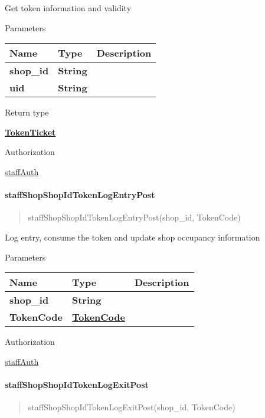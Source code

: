 Get token information and validity

Parameters

\begin{longtable}[]{@{}lll@{}}
\toprule
Name & Type & Description\tabularnewline
\midrule
\endhead
\textbf{shop\_id} & \textbf{String} &\tabularnewline
\textbf{uid} & \textbf{String} &\tabularnewline
\bottomrule
\end{longtable}

Return type

\href{../Models/TokenTicket.md}{\textbf{TokenTicket}}

Authorization

\href{../README.md\#staffAuth}{staffAuth}

\hypertarget{staffshopshopidtokenlogentrypost}{%
\paragraph{\texorpdfstring{\textbf{staffShopShopIdTokenLogEntryPost}}{staffShopShopIdTokenLogEntryPost}}\label{staffshopshopidtokenlogentrypost}}

\begin{quote}
staffShopShopIdTokenLogEntryPost(shop\_id, TokenCode)
\end{quote}

Log entry, consume the token and update shop occupancy information

Parameters

\begin{longtable}[]{@{}lll@{}}
\toprule
Name & Type & Description\tabularnewline
\midrule
\endhead
\textbf{shop\_id} & \textbf{String} &\tabularnewline
\textbf{TokenCode} & \href{../Models/TokenCode.md}{\textbf{TokenCode}}
&\tabularnewline
\bottomrule
\end{longtable}

Authorization

\href{../README.md\#staffAuth}{staffAuth}

\hypertarget{staffshopshopidtokenlogexitpost}{%
\paragraph{\texorpdfstring{\textbf{staffShopShopIdTokenLogExitPost}}{staffShopShopIdTokenLogExitPost}}\label{staffshopshopidtokenlogexitpost}}

\begin{quote}
staffShopShopIdTokenLogExitPost(shop\_id, TokenCode)
\end{quote}

